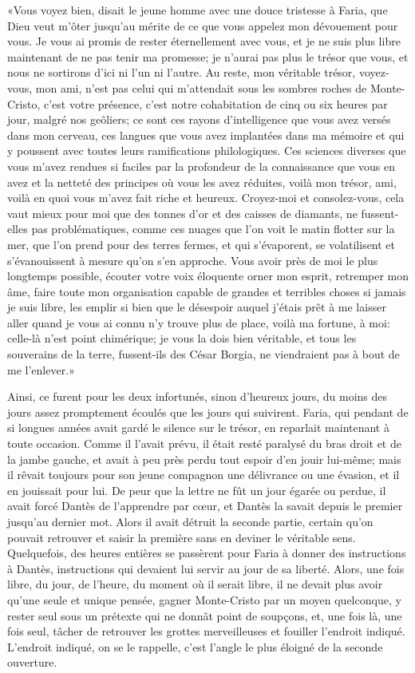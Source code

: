 «Vous voyez bien, disait le jeune homme avec une douce tristesse à Faria, que Dieu veut m'ôter jusqu'au mérite de ce que vous appelez mon dévouement pour vous. Je vous ai promis de rester éternellement avec vous, et je ne suis plus libre maintenant de ne pas tenir ma promesse; je n'aurai pas plus le trésor que vous, et nous ne sortirons d'ici ni l'un ni l'autre. Au reste, mon véritable trésor, voyez-vous, mon ami, n'est pas celui qui m'attendait sous les sombres roches de Monte-Cristo, c'est votre présence, c'est notre cohabitation de cinq ou six heures par jour, malgré nos geôliers; ce sont ces rayons d'intelligence que vous avez versés dans mon cerveau, ces langues que vous avez implantées dans ma mémoire et qui y poussent avec toutes leurs ramifications philologiques. Ces sciences diverses que vous m'avez rendues si faciles par la profondeur de la connaissance que vous en avez et la netteté des principes où vous les avez réduites, voilà mon trésor, ami, voilà en quoi vous m'avez fait riche et heureux. Croyez-moi et consolez-vous, cela vaut mieux pour moi que des tonnes d'or et des caisses de diamants, ne fussent-elles pas problématiques, comme ces nuages que l'on voit le matin flotter sur la mer, que l'on prend pour des terres fermes, et qui s'évaporent, se volatilisent et s'évanouissent à mesure qu'on s'en approche. Vous avoir près de moi le plus longtemps possible, écouter votre voix éloquente orner mon esprit, retremper mon âme, faire toute mon organisation capable de grandes et terribles choses si jamais je suis libre, les emplir si bien que le désespoir auquel j'étais prêt à me laisser aller quand je vous ai connu n'y trouve plus de place, voilà ma fortune, à moi: celle-là n'est point chimérique; je vous la dois bien véritable, et tous les souverains de la terre, fussent-ils des César Borgia, ne viendraient pas à bout de me l'enlever.»

Ainsi, ce furent pour les deux infortunés, sinon d'heureux jours, du moins des jours assez promptement écoulés que les jours qui suivirent. Faria, qui pendant de si longues années avait gardé le silence sur le trésor, en reparlait maintenant à toute occasion. Comme il l'avait prévu, il était resté paralysé du bras droit et de la jambe gauche, et avait à peu près perdu tout espoir d'en jouir lui-même; mais il rêvait toujours pour son jeune compagnon une délivrance ou une évasion, et il en jouissait pour lui. De peur que la lettre ne fût un jour égarée ou perdue, il avait forcé Dantès de l'apprendre par cœur, et Dantès la savait depuis le premier jusqu'au dernier mot. Alors il avait détruit la seconde partie, certain qu'on pouvait retrouver et saisir la première sans en deviner le véritable sens. Quelquefois, des heures entières se passèrent pour Faria à donner des instructions à Dantès, instructions qui devaient lui servir au jour de sa liberté. Alors, une fois libre, du jour, de l'heure, du moment où il serait libre, il ne devait plus avoir qu'une seule et unique pensée, gagner Monte-Cristo par un moyen quelconque, y rester seul sous un prétexte qui ne donnât point de soupçons, et, une fois là, une fois seul, tâcher de retrouver les grottes merveilleuses et fouiller l'endroit indiqué. L'endroit indiqué, on se le rappelle, c'est l'angle le plus éloigné de la seconde ouverture.

